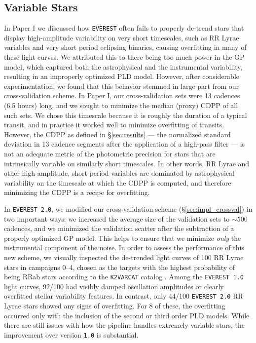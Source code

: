 \documentclass[]{emulateapj}
\newcommand{\edited}[1]{{\color{red} #1}}
\begin{document}
\subsection{Variable Stars}
\label{sec:variables}
In Paper I we discussed how \texttt{EVEREST} often fails to properly de-trend stars
that \edited{display high-amplitude variability on very short timescales},
such as RR Lyrae variables and very short period eclipsing
binaries, causing overfitting in many of these light curves. We attributed this to
there being too much power in the GP model, which
captured both the astrophysical and the instrumental variability, resulting in an
improperly optimized PLD model. However, after considerable experimentation, we
found that this behavior stemmed in large part from our cross-validation scheme.
In Paper I, our cross-validation sets were 13 cadences (6.5 hours) long, and we sought to
minimize the median (proxy) CDPP of all such sets. We chose this timescale
because it is roughly the duration of a typical transit, and in practice
it worked well to minimize overfitting of transits. However, the CDPP as defined in
\S\ref{sec:results} --- the normalized standard deviation in 13 cadence segments
after the application of a high-pass filter --- is not an adequate metric of the
photometric precision for stars that are intrinsically variable on similarly short
timescales. In other words, RR Lyrae and other \edited{high-amplitude, short-period} variables
are dominated by astrophysical
variability on the timescale at which the CDPP is computed, and therefore
minimizing the CDPP is a recipe for overfitting.

In \texttt{EVEREST 2.0}, we modified our cross-validation scheme (\S\ref{sec:impl_crossval})
in two important ways: we increased the average size of the validation sets to
${\sim}500$ cadences, and we minimized the validation scatter after the subtraction of
a properly optimized GP model. This helps to ensure that we minimize \emph{only} the instrumental
component of the noise. In order to assess the performance of this new scheme, we
visually inspected the de-trended light curves of 100 RR Lyrae stars in campaigns 0--4,
chosen as the targets with the highest probability of being RRab stars
according to the \texttt{K2VARCAT} catalog \citep{Armstrong16}.
Among the \texttt{EVEREST 1.0} light curves, 92/100 had visibly damped
oscillation amplitudes or clearly overfitted stellar variability features. In contrast,
only 44/100 \texttt{EVEREST 2.0} RR Lyrae stars showed any signs of overfitting. For 8
of these, the overfitting occurred only with the inclusion of the second or third order PLD
models. While there are still issues with how the pipeline handles extremely variable
stars, the improvement over version \texttt{1.0} is substantial.
\end{document}
